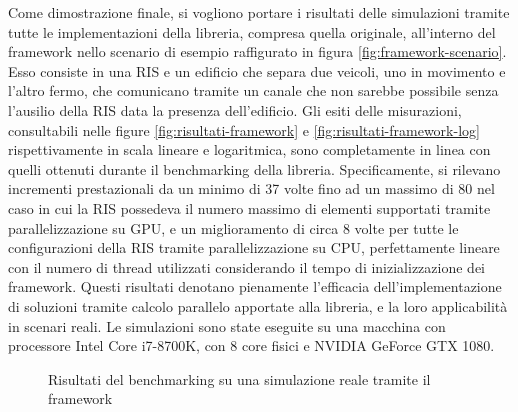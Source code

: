 Come dimostrazione finale, si vogliono portare i risultati delle simulazioni
tramite tutte le implementazioni della libreria, compresa quella originale, all'interno
del framework nello scenario di esempio raffigurato in figura
\ref{fig:framework-scenario}. Esso consiste in una RIS e un edificio che separa due
veicoli, uno in movimento e l'altro fermo, che comunicano tramite un canale che non
sarebbe possibile senza l'ausilio della RIS data la presenza dell'edificio. Gli
esiti delle misurazioni, consultabili nelle figure \ref{fig:risultati-framework}
e \ref{fig:risultati-framework-log} rispettivamente in scala lineare e logaritmica,
sono completamente in linea con quelli ottenuti durante il benchmarking della
libreria. Specificamente, si rilevano incrementi prestazionali da un minimo di
37 volte fino ad un massimo di 80 nel caso in cui la RIS possedeva il numero
massimo di elementi supportati tramite parallelizzazione su GPU, e un miglioramento
di circa 8 volte per tutte le configurazioni della RIS tramite parallelizzazione
su CPU, perfettamente lineare con il numero di thread utilizzati considerando il
tempo di inizializzazione dei framework. Questi risultati denotano pienamente l'efficacia
dell'implementazione di soluzioni tramite calcolo parallelo apportate alla libreria,
e la loro applicabilità in scenari reali. Le simulazioni sono state eseguite su una
macchina con processore Intel Core i7-8700K, con 8 core fisici e NVIDIA GeForce
GTX 1080.

\begin{figure}[!ht]
  \centering
  \caption{Risultati del benchmarking su una simulazione reale tramite il
  framework}
\end{figure}